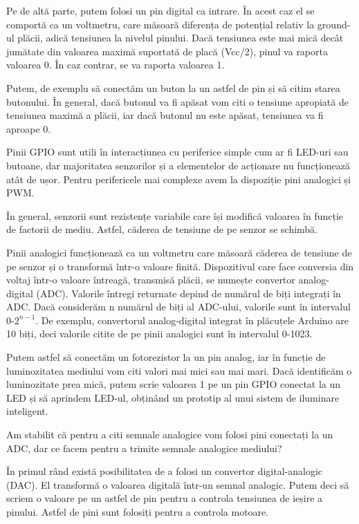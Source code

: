 Pe de altă parte, putem folosi un pin digital ca intrare. În acest caz el se
comportă ca un voltmetru, care măsoară diferența de potențial relativ la
ground-ul plăcii, adică tensiunea la nivelul pinului. Dacă tensiunea este mai
mică decât jumătate din valoarea maximă suportată de placă (Vcc/2), pinul va
raporta valoarea 0. În caz contrar, se va raporta valoarea 1.

Putem, de exemplu să conectăm un buton la un astfel de pin și să citim starea
butonului. În general, dacă butonul va fi apăsat vom citi o tensiune apropiată
de tensiunea maximă a plăcii, iar dacă butonul nu este apăsat, tensiunea va fi
aproape 0.

Pinii GPIO sunt utili în interacțiunea cu periferice simple cum ar fi LED-uri
sau butoane, dar majoritatea senzorilor și a elementelor de acționare nu
funcționează atât de ușor. Pentru perifericele mai complexe avem la dispoziție
pini analogici și PWM.

În general, senzorii sunt rezistențe variabile care își modifică valoarea în
funcție de factorii de mediu. Astfel, căderea de tensiune de pe senzor se
schimbă.

Pinii analogici funcționează ca un voltmetru care măsoară căderea de tensiune de
pe senzor și o transformă într-o valoare finită. Dispozitivul care face
conversia din voltaj într-o valoare întreagă, transmisă plăcii, se numește
convertor analog-digital (ADC). Valorile întregi returnate depind de numărul de
biți integrați în ADC. Dacă considerăm n numărul de biți al ADC-ului, valorile
sunt în intervalul 0-$2^{n-1}$. De exemplu, convertorul analog-digital integrat în
plăcuțele Arduino are 10 biți, deci valorile citite de pe pinii analogici sunt
în intervalul 0-1023.

Putem astfel să conectăm un fotorezistor la un pin analog, iar în funcție de
luminozitatea mediului vom citi valori mai mici sau mai mari. Dacă identificăm o
luminozitate prea mică, putem scrie valoarea 1 pe un pin GPIO conectat la un LED
și să aprindem LED-ul, obținând un prototip al unui sistem de iluminare
inteligent.

Am stabilit că pentru a citi semnale analogice vom folosi pini conectați la un
ADC, dar ce facem pentru a trimite semnale analogice mediului?

În primul rând există posibilitatea de a folosi un convertor digital-analogic
(DAC). El transformă o valoarea digitală într-un semnal analogic. Putem deci să
scriem o valoare pe un astfel de pin pentru a controla tensiunea de ieșire a
pinului. Astfel de pini sunt folosiți pentru a controla motoare.

